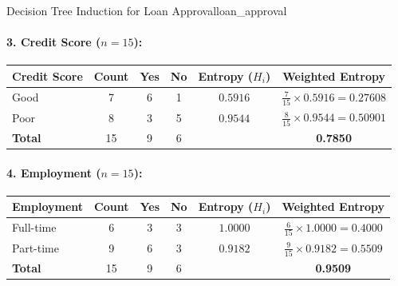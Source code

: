 \begin{example}{Decision Tree Induction for Loan Approval}{loan_approval}
\paragraph{3. Credit Score ($n = 15$):}
\begin{center}\renewcommand{\arraystretch}{1.35}
\begin{tabular}{lccccc}
\toprule
\textbf{Credit Score} & \textbf{Count} & \textbf{Yes} & \textbf{No} & \textbf{Entropy ($H_i$)} & \textbf{Weighted Entropy} \\
\midrule
Good & 7 & 6 & 1 & $0.5916$ & $\frac{7}{15} \times 0.5916 = 0.27608$ \\
Poor & 8 & 3 & 5 & $0.9544$ & $\frac{8}{15} \times 0.9544 = 0.50901$ \\
\midrule
\textbf{Total} & 15 & 9 & 6 & & \textbf{0.7850} \\
\bottomrule
\end{tabular}
\end{center}

\paragraph{4. Employment ($n = 15$):}
\begin{center}\renewcommand{\arraystretch}{1.35}
\begin{tabular}{lccccc}
\toprule
\textbf{Employment} & \textbf{Count} & \textbf{Yes} & \textbf{No} & \textbf{Entropy ($H_i$)} & \textbf{Weighted Entropy} \\
\midrule
Full-time & 6 & 3 & 3 & $1.0000$ & $\frac{6}{15} \times 1.0000 = 0.4000$ \\
Part-time & 9 & 6 & 3 & $0.9182$ & $\frac{9}{15} \times 0.9182 = 0.5509$ \\
\midrule
\textbf{Total} & 15 & 9 & 6 & & \textbf{0.9509} \\
\bottomrule
\end{tabular}
\end{center}


\end{example}
